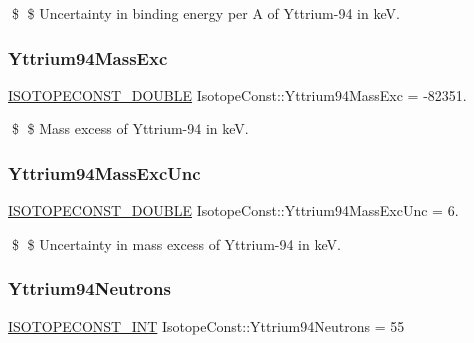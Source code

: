 \$ \$ Uncertainty in binding energy per A of Yttrium-\/94 in keV. \mbox{\label{group___isotope_const-_yttrium-_y94_ga0607cc16cba9debc28887c5450e78c76}} 
\subsubsection{\texorpdfstring{Yttrium94\+Mass\+Exc}{Yttrium94MassExc}}
{\footnotesize\ttfamily \mbox{\hyperlink{group___isotope_const-_macros_ga8f45a7272ce02c0b4c65c44636ed719a}{I\+S\+O\+T\+O\+P\+E\+C\+O\+N\+S\+T\+\_\+\+D\+O\+U\+B\+LE}} Isotope\+Const\+::\+Yttrium94\+Mass\+Exc = -\/82351.}

\$ \$ Mass excess of Yttrium-\/94 in keV. \mbox{\label{group___isotope_const-_yttrium-_y94_ga6a49264f320e023b9fa30bdd433bf137}} 
\subsubsection{\texorpdfstring{Yttrium94\+Mass\+Exc\+Unc}{Yttrium94MassExcUnc}}
{\footnotesize\ttfamily \mbox{\hyperlink{group___isotope_const-_macros_ga8f45a7272ce02c0b4c65c44636ed719a}{I\+S\+O\+T\+O\+P\+E\+C\+O\+N\+S\+T\+\_\+\+D\+O\+U\+B\+LE}} Isotope\+Const\+::\+Yttrium94\+Mass\+Exc\+Unc = 6.}

\$ \$ Uncertainty in mass excess of Yttrium-\/94 in keV. \mbox{\label{group___isotope_const-_yttrium-_y94_ga053f964ec0472e51b2c0e29555f42a8b}} 
\subsubsection{\texorpdfstring{Yttrium94\+Neutrons}{Yttrium94Neutrons}}
{\footnotesize\ttfamily \mbox{\hyperlink{group___isotope_const-_macros_ga5f18360b3e99483a35c32d789e62621c}{I\+S\+O\+T\+O\+P\+E\+C\+O\+N\+S\+T\+\_\+\+I\+NT}} Isotope\+Const\+::\+Yttrium94\+Neutrons = 55}

